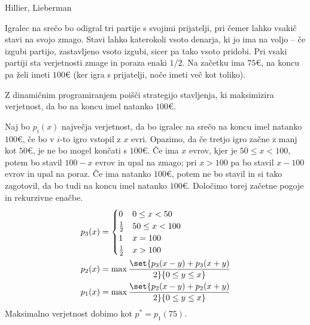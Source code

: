 \begin{naloga}{Hillier, Lieberman}{\cite[Problem~11.4-1]{hl}}
\begin{vprasanje}
Igralec na srečo bo odigral tri partije s svojimi prijatelji,
pri čemer lahko vsakič stavi na svojo zmago.
Stavi lahko katerokoli vsoto denarja, ki jo ima na voljo
-- če izgubi partijo, zastavljeno vsoto izgubi, sicer pa tako vsoto pridobi.
Pri vsaki partiji sta verjetnosti zmage in poraza enaki $1/2$.
Na začetku ima $75 €$, na koncu pa želi imeti $100 €$
(ker igra s prijatelji, noče imeti več kot toliko).

Z dinamičnim programiranjem poišči strategijo stavljenja,
ki maksimizira verjetnost, da bo na koncu imel natanko $100 €$.
\end{vprasanje}

\begin{odgovor}
Naj bo $p_i(x)$ največja verjetnost,
da bo igralec na srečo na koncu imel natanko $100 €$,
če bo v $i$-to igro vstopil z $x$ evri.
Opazimo, da če tretjo igro začne z manj kot $50 €$,
je ne bo mogel končati s $100 €$.
Če ima $x$ evrov, kjer je $50 \le x < 100$,
potem bo stavil $100 - x$ evrov in upal na zmago;
pri $x > 100$ pa bo stavil $x - 100$ evrov in upal na poraz.
Če ima natanko $100 €$, potem ne bo stavil in si tako zagotovil,
da bo tudi na koncu imel natanko $100 €$.
Določimo torej začetne pogoje in rekurzivne enačbe.
\begin{align*}
p_3(x) &= \begin{cases}
0 & 0 \le x < 50 \\
{1 \over 2} & 50 \le x < 100 \\
1 & x = 100 \\
{1 \over 2} & x > 100
\end{cases} \\
p_2(x) &= \max\set{p_3(x-y) + p_3(x+y) \over 2}{0 \le y \le x} \\
p_1(x) &= \max\set{p_2(x-y) + p_2(x+y) \over 2}{0 \le y \le x}
\end{align*}
Maksimalno verjetnost dobimo kot $p^* = p_1(75)$.


\end{odgovor}
\end{naloga}
